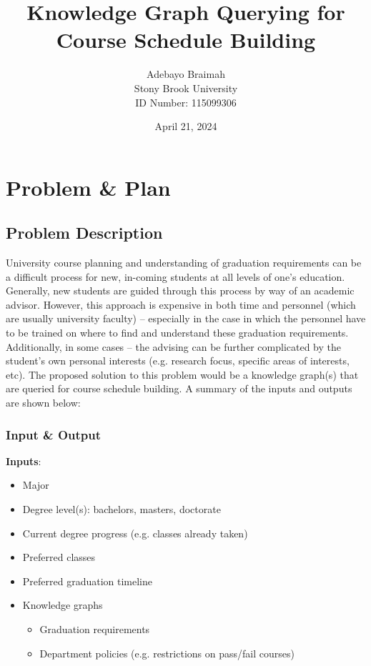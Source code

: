 \documentclass[12pt]{article}
\title{\Large \bf 
Knowledge Graph Querying for Course Schedule Building
}
\author{
{\rm Adebayo Braimah}\\
Stony Brook University \\
{\rm ID Number: 115099306}
}
\date{April 21, 2024}
\begin{document}
    
    \maketitle
        
    \section{Problem \& Plan}
    \label{sec:prob_plan}
    
    \subsection{Problem Description}
    \label{subsec:problem}
    University course planning and understanding of graduation requirements can be a difficult process for new, in-coming students at all levels of one's education. Generally, new students are guided through this process by way of an academic advisor. However, this approach is expensive in both time and personnel (which are usually university faculty) -- especially in the case in which the personnel have to be trained on where to find and understand these graduation requirements. Additionally, in some cases -- the advising can be further complicated by the student's own personal interests (e.g. research focus, specific areas of interests, etc). The proposed solution to this problem would be a knowledge graph(s) that are queried for course schedule building. A summary of the inputs and outputs are shown below:

    \subsubsection{Input \& Output}
    \label{subsubsec:in-out}
    
    \textbf{Inputs}:

    \begin{itemize}
        \label{items:inputs}
        \item Major
        \item Degree level(s): bachelors, masters, doctorate
        \item Current degree progress (e.g. classes already taken)
        \item Preferred classes
        \item Preferred graduation timeline
        \item Knowledge graphs
        \begin{itemize}
            \item Graduation requirements
            \item Department policies (e.g. restrictions on pass/fail courses)
        \end{itemize}
    \end{itemize}
\end{document}
